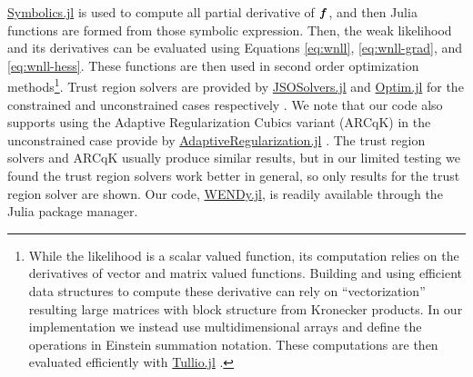 \href{https://docs.sciml.ai/Symbolics/stable/}{Symbolics.jl} \citep{GowdaMaCheliEtAl2021ACMCommunComputAlgebra} is used to compute all partial derivative of $\boldsymbol{f}$, and then Julia functions are formed from those symbolic expression. Then, the weak likelihood and its derivatives can be evaluated using Equations \eqref{eq:wnll}, \eqref{eq:wnll-grad}, and \eqref{eq:wnll-hess}. These functions are then used in second order optimization methods\footnote{While the likelihood is a scalar valued function, its computation relies on the derivatives of vector and matrix valued functions. Building and using efficient data structures to compute these derivative can rely on ``vectorization'' resulting large matrices with block structure from Kronecker products. In our implementation we instead use multidimensional arrays and define the operations in Einstein summation notation. These computations are then evaluated efficiently with \href{https://github.com/mcabbott/Tullio.jl?tab=readme-ov-file}{Tullio.jl} \citep{AbbottAluthgeN3N5EtAl2023}.}. Trust region solvers are provided by \href{https://github.com/JuliaSmoothOptimizers/JSOSolvers.jl}{JSOSolvers.jl} and \href{https://julianlsolvers.github.io/Optim.jl/stable/}{Optim.jl} for the constrained and unconstrained cases respectively \citep{KMogensenNRiseth2018JOSS, MigotOrbanSoaresSiqueira2024}. We note that our code also supports using the Adaptive Regularization Cubics variant (ARCqK) in the unconstrained case provide by \href{https://jso.dev/AdaptiveRegularization.jl/stable/} {AdaptiveRegularization.jl} \citep{DussaultMigotOrban2024MathProgram}. The trust region solvers and ARCqK usually produce similar results, but in our limited testing we found the trust region solvers work better in general, so only results for the trust region solver are shown. Our code, \href{https://github.com/nrummel/WENDy.jl}{WENDy.jl}, is readily available through the Julia package manager.

